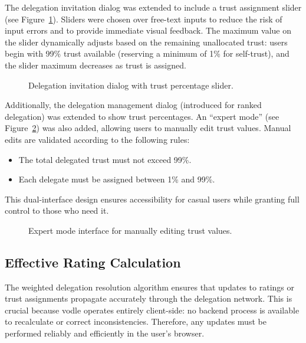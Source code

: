 The delegation invitation dialog was extended to include a trust assignment slider (see Figure~\ref{fig:trust-slider}). Sliders were chosen over free-text inputs to reduce the risk of input errors and to provide immediate visual feedback. The maximum value on the slider dynamically adjusts based on the remaining unallocated trust: users begin with 99\% trust available (reserving a minimum of 1\% for self-trust), and the slider maximum decreases as trust is assigned.

\begin{figure}[h]
    \centering
    \caption{Delegation invitation dialog with trust percentage slider.}
    \label{fig:trust-slider}
\end{figure}

Additionally, the delegation management dialog (introduced for ranked delegation) was extended to show trust percentages. An ``expert mode'' (see Figure~\ref{fig:expert-mode}) was also added, allowing users to manually edit trust values. Manual edits are validated according to the following rules:
\begin{itemize}
    \item The total delegated trust must not exceed 99\%.
    \item Each delegate must be assigned between 1\% and 99\%.
\end{itemize}

This dual-interface design ensures accessibility for casual users while granting full control to those who need it.

\begin{figure}[h]
    \centering
    \caption{Expert mode interface for manually editing trust values.}
    \label{fig:expert-mode}
\end{figure}

\subsection{Effective Rating Calculation}

The weighted delegation resolution algorithm ensures that updates to ratings or trust assignments propagate accurately through the delegation network. This is crucial because vodle operates entirely client-side: no backend process is available to recalculate or correct inconsistencies. Therefore, any updates must be performed reliably and efficiently in the user's browser.

